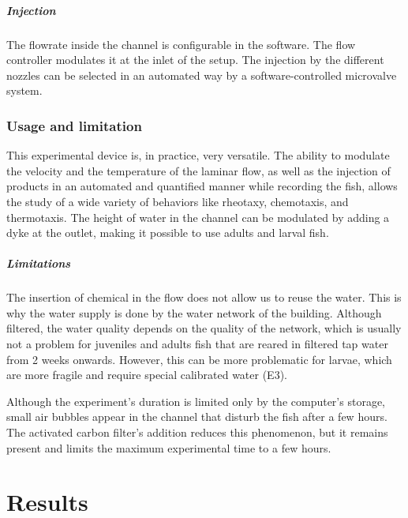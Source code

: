   \paragraph{Injection}
  The flowrate inside the channel is configurable in the software. The flow controller modulates it at the inlet of the setup. The injection by the different nozzles can be selected in an automated way by a software-controlled microvalve system.

  \subsection{Usage and limitation}
  This experimental device is, in practice, very versatile. The ability to modulate the velocity and the temperature of the laminar flow, as well as the injection of products in an automated and quantified manner while recording the fish, allows the study of a wide variety of behaviors like rheotaxy, chemotaxis, and thermotaxis. The height of water in the channel can be modulated by adding a dyke at the outlet, making it possible to use adults and larval fish.

  \paragraph{Limitations}
  The insertion of chemical in the flow does not allow us to reuse the water. This is why the water supply is done by the water network of the building. Although filtered, the water quality depends on the quality of the network, which is usually not a problem for juveniles and adults fish that are reared in filtered tap water from 2 weeks onwards. However, this can be more problematic for larvae, which are more fragile and require special calibrated water (E3).

  Although the experiment's duration is limited only by the computer's storage, small air bubbles appear in the channel that disturb the fish after a few hours. The activated carbon filter's addition reduces this phenomenon, but it remains present and limits the maximum experimental time to a few hours.

\chapter{Results}
